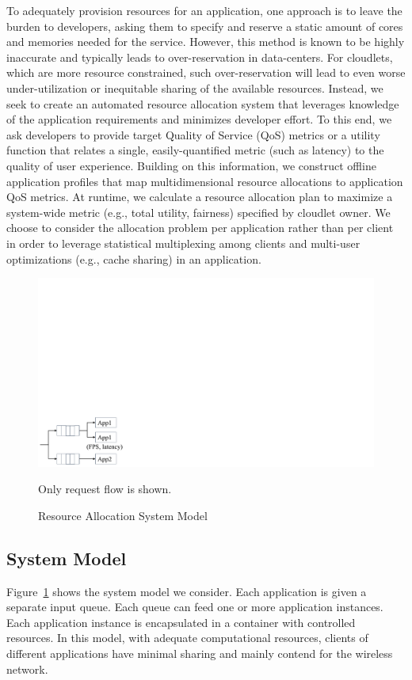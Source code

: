 To adequately provision resources for an application, one approach is
to leave the burden to developers, asking them to specify and reserve
a static amount of cores and memories needed for the service. However,
this method is known to be highly inaccurate and typically leads to
over-reservation in data-centers. For cloudlets, which are more
resource constrained, such over-reservation will lead to even worse
under-utilization or inequitable sharing of the available resources.
Instead, we seek to create an automated resource allocation system
that leverages knowledge of the application requirements and minimizes
developer effort.  To this end, we ask developers to provide target
Quality of Service (QoS) metrics or a utility function that relates a
single, easily-quantified metric (such as latency) to the quality of
user experience.  Building on this information, we construct offline
application profiles that map multidimensional resource allocations to
application QoS metrics.  At runtime, we calculate a resource
allocation plan to maximize a system-wide metric (e.g., total utility,
fairness) specified by cloudlet owner. We choose to consider the
allocation problem per application rather than per client in order to
leverage statistical multiplexing among clients and multi-user
optimizations (e.g., cache sharing) in an application.

\begin{figure}
\centering
\includegraphics[width=0.5\linewidth]{FIGS/fig-allocation-system-model-cropped.pdf}
\begin{captiontext}Only request flow is shown.\end{captiontext}
\caption{Resource Allocation System Model}
\label{fig:allocation-system-model}
\vspace{-0.2in}
\end{figure}

\subsection{System Model}
Figure~\ref{fig:allocation-system-model} shows the system model we
consider. Each application is given a separate input queue. Each queue
can feed one or more application instances. Each application instance
is encapsulated in a container with controlled resources. In this
model, with adequate computational resources, clients of different
applications have minimal sharing and mainly contend for the wireless
network.


